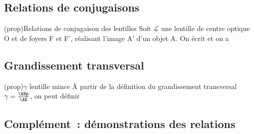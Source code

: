 \documentclass[../../main/main.tex]{subfiles}
\begin{document}
\subsection{Relations de conjugaisons}

\begin{tcb*}[label=prop:conjdescartes,
		list entry={\lte Rela$^\circ$ de conjug.\ des lentilles}
	](prop){Relations de conjugaison des
			lentilles}
	Soit $\mathcal{L}$ une lentille de centre optique O et de foyers F
	et F', réalisant l'image A' d'un objet A. On écrit
	et on a
	\smallbreak
	\begin{isd}
		\psw{%
			\[
				\boxed{ \frac{1}{\OFp} = \frac{1}{\OAp} - \frac{1}{\OA}}
			\]
		}%
		\tcblower
	\end{isd}
\end{tcb*}

\subsection{Grandissement transversal}

\begin{tcb*}[label=coro:lent_grand](prop){$\gamma$ lentille mince}
	À partir de la définition du grandissement transversal $\gamma =
		\frac{\ABp}{\AB}$, on peut définir

	\begin{isd}
		\psw{%
			\[
				\boxed{\gamma = \frac{\ABp}{\AB} = \frac{\OAp}{\OA}}
			\]
		}%
		\tcblower
		\psw{%
			\[
				\boxed{
					\gamma =
					\frac{\obar{\rm F'A'}}{\obar{\rm F'O}} =
					\frac{\obar{\rm FO}}{\obar{\rm FA}}}
			\]
		}%
	\end{isd}
\end{tcb*}

\subsection{Complément~: démonstrations des relations}
\end{document}
